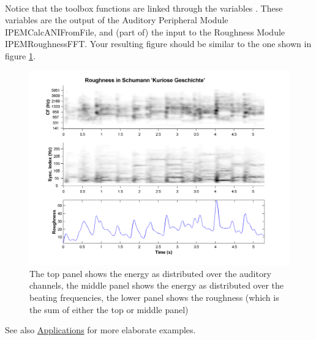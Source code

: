 \\

Notice that the toolbox functions are linked through the variables
. These variables are
the output of the Auditory Peripheral Module IPEMCalcANIFromFile,
and (part of) the input to the Roughness Module IPEMRoughnessFFT.
Your resulting figure should be similar
to the one shown in figure \ref{Fig:RMRoughness}.\\

\begin{figure}[h]
    \centering
    \includegraphics[width=\IPEMDefaultFigureWidth]{Graphics/RMRoughness}
    \caption{The top panel shows the energy as distributed over the
    auditory channels, the middle panel shows the energy as
    distributed over the beating frequencies, the lower panel
    shows the roughness (which is the sum of either the top or
    middle panel)}
    \label{Fig:RMRoughness}
\end{figure}

See also \hyperlink{Chapter:ConceptsApplications}{Applications}
for more elaborate examples.\\
